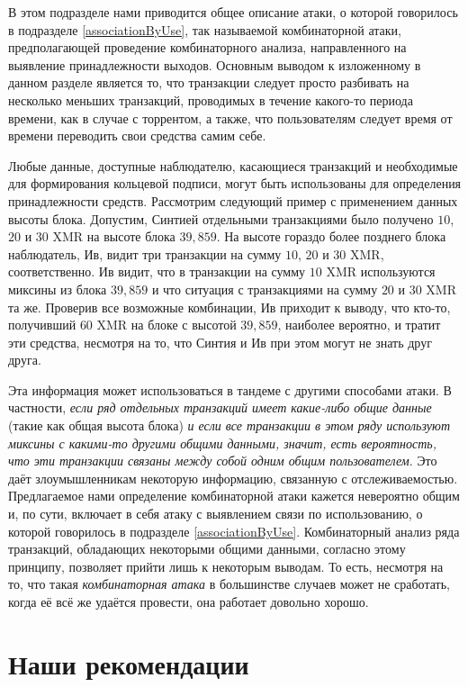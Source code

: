 \documentclass{mrl}
\begin{document}
В этом подразделе нами приводится общее описание атаки, о которой говорилось в подразделе \ref{associationByUse}, так называемой комбинаторной атаки, предполагающей проведение комбинаторного анализа, направленного на выявление принадлежности выходов. Основным выводом к изложенному в данном разделе является то, что транзакции следует просто разбивать на несколько меньших транзакций, проводимых в течение какого-то периода времени, как в случае с торрентом, а также, что пользователям следует время от времени переводить свои средства самим себе.

Любые данные, доступные наблюдателю, касающиеся транзакций и необходимые для формирования кольцевой подписи, могут быть использованы для определения принадлежности средств. Рассмотрим следующий пример с применением данных высоты блока. Допустим, Синтией отдельными транзакциями было получено $10$, $20$ и $30$ XMR на высоте блока $39,859$. На высоте гораздо более позднего блока наблюдатель, Ив, видит три транзакции на сумму $10$, $20$ и $30$ XMR, соответственно. Ив видит, что в транзакции на сумму $10$ XMR используются миксины из блока $39,859$ и что ситуация с транзакциями на сумму $20$ и $30$ XMR та же. Проверив все возможные комбинации, Ив приходит к выводу, что кто-то, получивший $60$ XMR на блоке с высотой $39,859$, наиболее вероятно, и тратит эти средства, несмотря на то, что Синтия и Ив при этом могут не знать друг друга.

Эта информация может использоваться в тандеме с другими способами атаки. В частности, \textit{если ряд отдельных транзакций имеет какие-либо общие данные} (такие как общая высота блока) \textit{и если все транзакции в этом ряду используют миксины с какими-то другими общими данными, значит, есть вероятность, что эти транзакции связаны между собой одним общим пользователем}. Это даёт злоумышленникам некоторую информацию, связанную с отслеживаемостью. Предлагаемое нами определение комбинаторной атаки кажется невероятно общим и, по сути, включает в себя атаку с выявлением связи по использованию, о которой говорилось в подразделе \ref{associationByUse}. Комбинаторный анализ ряда транзакций, обладающих некоторыми общими данными, согласно этому принципу, позволяет прийти лишь к некоторым выводам. То есть, несмотря на то, что такая \textit{комбинаторная атака} в большинстве случаев может не сработать, когда её всё же удаётся провести, она работает довольно хорошо.

\section{Наши рекомендации}\label{Recommendations}
\end{document}

